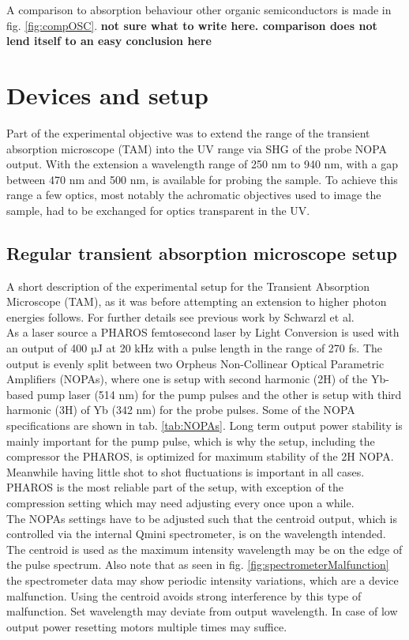 \documentclass[twoside,openright]{scrreprt}
\begin{document}
A comparison to absorption behaviour other organic semiconductors is made in fig. \ref{fig:compOSC}. \textbf{not sure what to write here. comparison does not lend itself to an easy conclusion here}


\chapter{Devices and setup}

Part of the experimental objective was to extend the range of the transient absorption microscope (TAM) into the UV range via SHG of the probe NOPA output. With the extension a wavelength range of 250 nm to 940 nm, with a gap between 470 nm and 500 nm, is available for probing the sample. To achieve this range a few optics, most notably the achromatic objectives used to image the sample, had to be exchanged for optics transparent in the UV.
\section{Regular transient absorption microscope setup}\label{RegTAM}
A short description of the experimental setup for the Transient Absorption Microscope (TAM), as it was before attempting an extension to higher photon energies follows. For further details see previous work by Schwarzl et al.\cite{Schwarzl2022}\\
As a laser source a PHAROS femtosecond laser by Light Conversion is used with an output of 400 µJ at 20 kHz with a pulse length in the range of 270 fs. The output is evenly split between two Orpheus Non-Collinear Optical Parametric Amplifiers (NOPAs), where one is setup with second harmonic (2H) of the Yb-based pump laser (514 nm) for the pump pulses and the other is setup with third harmonic (3H) of Yb (342 nm) for the probe pulses. Some of the NOPA specifications are shown in tab. \ref{tab:NOPAs}. Long term output power stability is mainly important for the pump pulse, which is why the setup, including the compressor the PHAROS, is optimized for maximum stability of the 2H NOPA. Meanwhile having little shot to shot fluctuations is important in all cases. PHAROS is the most reliable part of the setup, with exception of the compression setting which may need adjusting every once upon a while.\\

The NOPAs settings have to be adjusted such that the centroid output, which is controlled via the internal Qmini spectrometer, is on the wavelength intended. The centroid is used as the maximum intensity wavelength may be on the edge of the pulse spectrum. Also note that as seen in fig. \ref{fig:spectrometerMalfunction} the spectrometer data may show periodic intensity variations, which are a device malfunction. Using the centroid avoids strong interference by this type of malfunction. Set wavelength may deviate from output wavelength. In case of low output power resetting motors multiple times may suffice.
\end{document}
